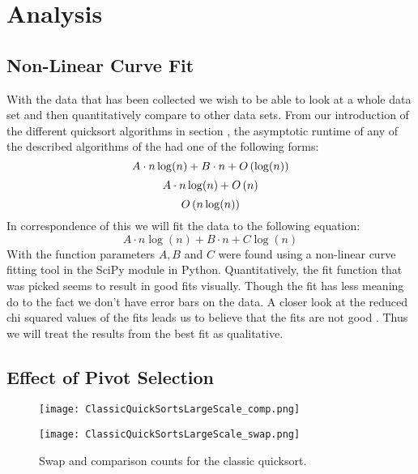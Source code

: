 \section{Analysis}
	\label{sec:Analysis}
	\subsection{Non-Linear Curve Fit}
		\label{subsec:CurveFit}

		With the data that has been collected we wish to be able to look at a whole data set and then quantitatively compare to other data sets. From our introduction of the different quicksort algorithms in section 	\label{sec:quicksortInto}, the asymptotic runtime of any of the described algorithms of the had one of the following forms:
		\begin{equation}
			A\cdot n\log(n) + B\cdot n + O\left(\log(n)\right)
		\end{equation}
		\begin{equation}
			A\cdot n\log(n) + O\left(n\right)
		\end{equation}
		\begin{equation}
			O\left(n\log(n)\right)
		\end{equation}
		In correspondence of this we will fit the data to the following equation:
		\begin{equation}
			A\cdot n\log(n) + B\cdot n + C\log(n)
			\label{eq:FitFunction}
		\end{equation}
		With the function parameters $A,B$ and $C$ were found using a non-linear curve fitting tool in the SciPy module in Python. Quantitatively, the fit function that was picked seems to result in good fits visually. Though the fit has less meaning do to the fact we don't have error bars on the data. A closer look at the reduced chi squared values of the fits leads us to believe that the fits are not good \cite{bevington1969data}. Thus we will treat the results from the best fit as qualitative.


	\subsection{Effect of Pivot Selection}
	\begin{figure}
		\centering
		\begin{minipage}{.5\textwidth}
		 	\centering
		 	\texttt{[image: ClassicQuickSortsLargeScale\_comp.png]}
		\end{minipage}%
		\begin{minipage}{.5\textwidth}
		 	\centering
		 	\texttt{[image: ClassicQuickSortsLargeScale\_swap.png]}
		\end{minipage}
		\caption{Swap and comparison counts for the classic quicksort.}
		\label{fig:classicSwapAndComp}
	\end{figure}


